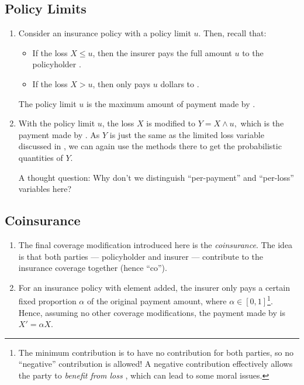 \subsection{Policy Limits}
\begin{enumerate}
\item Consider an insurance policy with a policy limit \(u\). Then, recall that:
\begin{itemize}
\item If the loss \(X\le u\), then the insurer  pays the full amount \(u\) to the policyholder .
\item If the loss \(X>u\), then  only pays \(u\) dollars to .
\end{itemize}
The policy limit \(u\) is the maximum amount of payment made by .

\item With the policy limit \(u\), the loss \(X\) is modified to \(Y=X\wedge
u,\) which is the payment  made by . As
\(Y\) is just the same as the limited loss variable discussed in
, we can again use the methods there to get the
probabilistic quantities of \(Y\).
\begin{note}
A thought question: Why don't we distinguish ``per-payment'' and ``per-loss''
variables here?
\end{note}
\end{enumerate}
\subsection{Coinsurance}
\begin{enumerate}
\item The final coverage modification introduced here is the
\emph{coinsurance}. The idea is that both parties --- policyholder 
and insurer  --- contribute to the insurance coverage together
(hence ``co'').

\item For an insurance policy with  element added, the
insurer  only pays a certain fixed proportion \(\alpha\) of
the original payment amount, where \(\alpha\in[0,1]\)\footnote{The minimum
contribution is to have no contribution for both parties, so no ``negative''
contribution is allowed! A negative contribution effectively allows the party
to \emph{benefit from loss }, which can lead to some moral
issues.}. Hence, assuming no other coverage modifications, the payment made by
 is \(X'=\alpha X\).
\end{enumerate}
